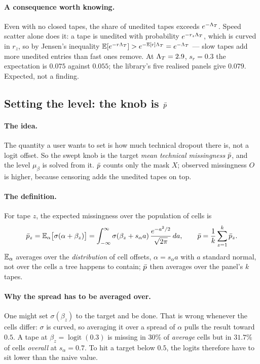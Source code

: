 \paragraph{A consequence worth knowing.} Even with no closed tapes, the share of unedited tapes exceeds
$e^{-\Lambda_T}$. Speed scatter alone does it: a tape is unedited with probability $e^{-r_z\Lambda_T}$, which is
curved in $r_z$, so by Jensen's inequality $\mathbb{E}[e^{-r\Lambda_T}]>e^{-\mathbb{E}[r]\Lambda_T}=e^{-\Lambda_T}$ --- slow tapes
add more unedited entries than fast ones remove. At $\Lambda_T=2.9$, $s_r=0.3$ the expectation is $0.075$
against $0.055$; the library's five realised panels give $0.079$. Expected, not a finding.

\subsection{\texorpdfstring{Setting the level: the knob is $\bar p$}{Setting the level: the knob is pbar}}\label{sec:pbar}

\paragraph{The idea.} The quantity a user wants to set is how much technical dropout there is, not a
logit offset. So the swept knob is the target \emph{mean technical missingness} $\bar p$, and the level
$\mu_\beta$ is solved from it. $\bar p$ counts only the mask $X$; observed missingness $O$ is higher,
because censoring adds the unedited tapes on top.

\paragraph{The definition.} For tape $z$, the expected missingness over the population of cells is
\begin{equation}
  \bar p_z=\mathbb{E}_\alpha\big[\sigma(\alpha+\beta_z)\big]
  =\int_{-\infty}^{\infty}\sigma(\beta_z+s_\alpha a)\,\frac{e^{-a^2/2}}{\sqrt{2\pi}}\,da ,
  \qquad
  \bar p=\frac1k\sum_{z=1}^k\bar p_z .
  \label{eq:pbar}
\end{equation}
$\mathbb{E}_\alpha$ averages over the \emph{distribution} of cell offsets, $\alpha=s_\alpha a$ with $a$ standard
normal, not over the cells a tree happens to contain; $\bar p$ then averages over the panel's $k$ tapes.

\paragraph{Why the spread has to be averaged over.} One might set $\sigma(\beta_z)$ to the target and be
done. That is wrong whenever the cells differ: $\sigma$ is curved, so averaging it over a spread of
$\alpha$ pulls the result toward $0.5$. A tape at $\beta_z=\operatorname{logit}(0.3)$ is missing in
$30\%$ of \emph{average} cells but in $31.7\%$ of cells \emph{overall} at $s_\alpha=0.7$. To hit a target
below $0.5$, the logits therefore have to sit lower than the naive value.

